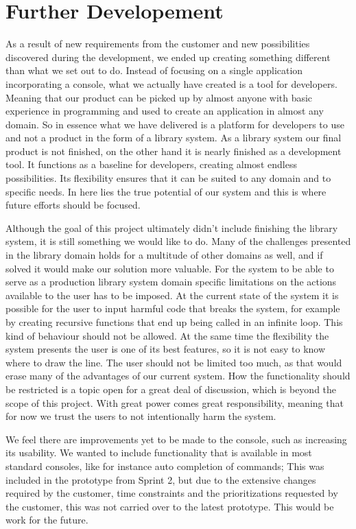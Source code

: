 \section{Further Developement}
As a result of new requirements from the customer and new possibilities discovered during the development, we ended up creating something different than what we set out to do. Instead of focusing on a single application incorporating a console, what we actually have created is a tool for developers. Meaning that our product can be picked up by almost anyone with basic experience in programming and used to create an application in almost any domain. So in essence what we have delivered is a platform for developers to use and not a product in the form of a library system. As a library system our final product is not finished, on the other hand it is nearly finished as a development tool. It functions as a baseline for developers, creating almost endless possibilities. Its flexibility ensures that it can be suited to any domain and to specific needs. In here lies the true potential of our system and this is where future efforts should be focused.

Although the goal of this project ultimately didn’t include finishing the library system, it is still something we would like to do. Many of the challenges presented in the library domain holds for a multitude of other domains as well, and if solved it would make our solution more valuable. For the system to be able to serve as a production library system domain specific limitations on the actions available to the user has to be imposed. At the current state of the system it is possible for the user to input harmful code that breaks the system, for example by creating recursive functions that end up being called in an infinite loop. This kind of behaviour should not be allowed. At the same time the flexibility the system presents the user is one of its best features, so it is not easy to know where to draw the line. The user should not be limited too much, as that would erase many of the advantages of our current system. How the functionality should be restricted is a topic open for a great deal of discussion, which is beyond the scope of this project. With great power comes great responsibility, meaning that for now we trust the users to not intentionally harm the system. 

We feel there are improvements yet to be made to the console, such as increasing its usability. We wanted to include functionality that is available in most standard consoles, like for instance auto completion of commands; This was included in the prototype from Sprint 2, but due to the extensive changes required by the customer, time constraints and the prioritizations requested by the customer, this was not carried over to the latest prototype. This would be work for the future.

